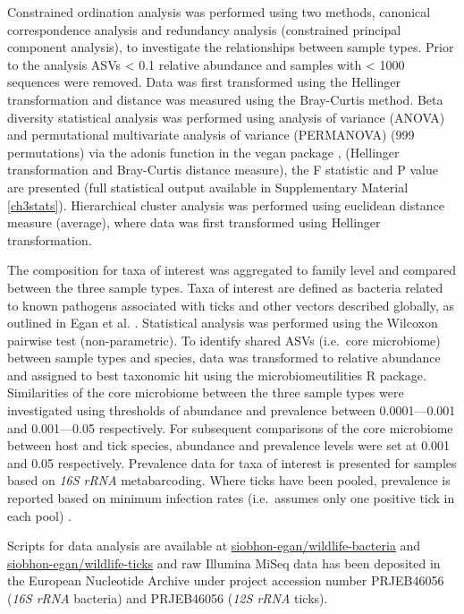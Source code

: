 \documentclass[a4paper, nobind]{templates/ociamthesis}
\begin{document}
Constrained ordination analysis was performed using two methods, canonical correspondence analysis and redundancy analysis (constrained principal component analysis), to investigate the relationships between sample types.
Prior to the analysis ASVs \textless{} 0.1 relative abundance and samples with \textless{} 1000 sequences were removed.
Data was first transformed using the Hellinger transformation and distance was measured using the Bray-Curtis method.
Beta diversity statistical analysis was performed using analysis of variance (ANOVA) and permutational multivariate analysis of variance (PERMANOVA) (999 permutations) via the adonis function in the vegan package \autocite{oksanenVeganCommunityEcology2020}, (Hellinger transformation and Bray-Curtis distance measure), the F statistic and P value are presented (full statistical output available in Supplementary Material \ref{ch3stats}).
Hierarchical cluster analysis was performed using euclidean distance measure (average), where data was first transformed using Hellinger transformation.

The composition for taxa of interest was aggregated to family level and compared between the three sample types.
Taxa of interest are defined as bacteria related to known pathogens associated with ticks and other vectors described globally, as outlined in Egan et al. \autocite*{eganBacterialCommunityProfiling2020}.
Statistical analysis was performed using the Wilcoxon pairwise test (non-parametric).
To identify shared ASVs (i.e.~core microbiome) between sample types and species, data was transformed to relative abundance and assigned to best taxonomic hit using the microbiomeutilities R package.
Similarities of the core microbiome between the three sample types were investigated using thresholds of abundance and prevalence between 0.0001---0.001 and 0.001---0.05 respectively.
For subsequent comparisons of the core microbiome between host and tick species, abundance and prevalence levels were set at 0.001 and 0.05 respectively.
Prevalence data for taxa of interest is presented for samples based on \emph{16S rRNA} metabarcoding. Where ticks have been pooled, prevalence is reported based on minimum infection rates (i.e.~assumes only one positive tick in each pool) \autocite{estrada-penaPitfallsTickTickBorne2021}.

Scripts for data analysis are available at \href{https://github.com/siobhon-egan/wildlife-bacteria}{siobhon-egan/wildlife-bacteria} and \href{https://github.com/siobhon-egan/wildlife-ticks}{siobhon-egan/wildlife-ticks} and raw Illumina MiSeq data has been deposited in the European Nucleotide Archive under project accession number PRJEB46056 (\emph{16S rRNA} bacteria) and PRJEB46056 (\emph{12S rRNA} ticks).
\end{document}
